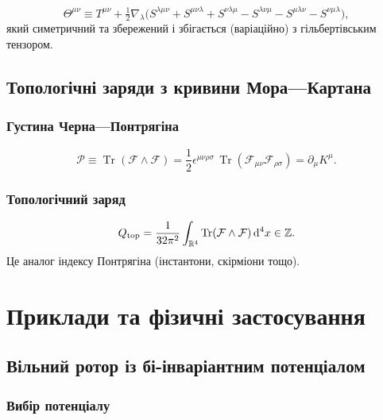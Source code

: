 \documentclass[11pt,a4paper]{article}
\numberwithin{equation}{section}
\theoremstyle{plain}
\theoremstyle{definition}
\theoremstyle{remark}
\DeclareMathOperator{\Tr}{Tr}
\newcommand{\dd}{\mathrm{d}}
\begin{document}
\begin{equation}
\Theta^{\mu\nu} \equiv T^{\mu\nu} + \tfrac{1}{2}\nabla_\lambda\!\big( S^{\lambda\mu\nu} + S^{\mu\nu\lambda} + S^{\nu\lambda\mu} - S^{\lambda\nu\mu} - S^{\mu\lambda\nu} - S^{\nu\mu\lambda} \big),
\label{eq:belinfante-def}
\end{equation}
який симетричний та збережений і збігається (варіаційно) з гільбертівським тензором.

\subsection{Топологічні заряди з кривини Мора—Картана}

\subsubsection{Густина Черна—Понтрягіна}

\begin{equation}
\mathcal{P} \equiv \Tr(\mathcal{F}\wedge\mathcal{F}) = \frac{1}{2}\epsilon^{\mu\nu\rho\sigma}\,\Tr(\mathcal{F}_{\mu\nu}\mathcal{F}_{\rho\sigma})=\partial_\mu K^\mu.
\label{eq:chern-pontryagin}
\end{equation}

\subsubsection{Топологічний заряд}

\begin{equation}
Q_{\rm top} = \frac{1}{32\pi^2}\int_{\mathbb{R}^4} \Tr(\mathcal{F}\wedge\mathcal{F})\, \dd^4x \in \mathbb{Z}.
\label{eq:Q-top}
\end{equation}
Це аналог індексу Понтрягіна (інстантони, скірміони тощо).

\section{Приклади та фізичні застосування}
\label{sec:examples}

\subsection{Вільний ротор із бі-інваріантним потенціалом}

\subsubsection{Вибір потенціалу}
\end{document}
